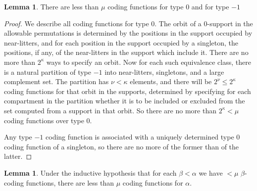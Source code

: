 \documentclass[112pt]{article}
\theoremstyle{definition}
\newtheorem{lemma}[theorem]{Lemma}
\theoremstyle{remark}
\newcommand{\rk}[1]{{\color{blue}\sl #1}}
\begin{document}
\begin{lemma}\label{lem:count_coding_function_zero}
{There are less than $\mu$ coding functions for type 0 and for type $-1$}
\end{lemma}
\begin{proof}
We describe all coding functions for type 0.  The orbit of a 0-support in the allowable permutations is determined by the positions in the support  occupied by near-litters, and for each position in the support occupied by a singleton, the positions, if any, of the near-litters in the support  which include it.  %
  There are no more than $2^\kappa$ ways to specify an orbit.  Now for each such equivalence class, there is a natural partition of type $-1$ into near-litters, singletons, and a large complement set.  The partition has $\nu<\kappa$ elements, and there will be $2^\nu\leq 2^\kappa$ coding functions for that orbit in the supports, determined by specifying for each compartment in the partition whether it is to be included or excluded from the set computed from a support in that orbit.  So there are no more than $2^\kappa<\mu$ coding functions over type 0.

Any type $-1$ coding function is associated with a uniquely determined type 0 coding function of a singleton, so there are no more of the former than of the latter.

\end{proof}

\begin{lemma}\label{lem:count_coding_function}
{Under the inductive hypothesis that for each $\beta<\alpha$ we have $<\mu$ $\beta$-coding functions, there are less than $\mu$ coding functions for $\alpha$.}
\end{lemma}
\end{document}
